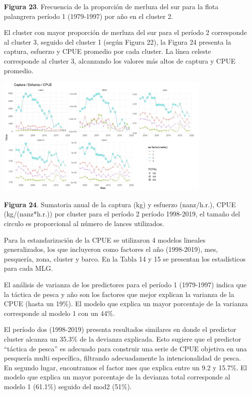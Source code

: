 \documentclass[
  spanish,
]{article}
\begin{document}
\small \textbf{Figura 23}. Frecuencia de la proporción de merluza del
sur para la flota palangrera período 1 (1979-1997) por año en el cluster
2. \vspace{0.5cm} \normalsize    

El cluster con mayor proporción de merluza del sur para el período 2
corresponde al cluster 3, seguido del cluster 1 (según Figura 22), la
Figura 24 presenta la captura, esfuerzo y CPUE promedio por cada
cluster. La línea celeste corresponde al cluster 3, alcanzando los
valores más altos de captura y CPUE promedio.

\begin{center}
\includegraphics[width=0.8\textwidth]{Figuras/Figura_24.png}
\end{center}

\small \textbf{Figura 24}. Sumatoria anual de la captura (kg) y esfuerzo
(nanz/h.r.), CPUE (kg/(nanz*h.r.)) por cluster para el período 2 período
1998-2019, el tamaño del circulo es proporcional al número de lances
utilizados. \vspace{0.5cm} \normalsize   

Para la estandarización de la CPUE se utilizaron 4 modelos lineales
generalizados, los que incluyeron como factores el año (1998-2019), mes,
pesquería, zona, cluster y barco. En la Tabla 14 y 15 se presentan los
estadísticos para cada MLG.

El análisis de varianza de los predictores para el período 1 (1979-1997)
indica que la táctica de pesca y año son los factores que mejor explican
la varianza de la CPUE (hasta un 19\%). El modelo que explica un mayor
porcentaje de la varianza corresponde al modelo 1 con un 44\%.

El período dos (1998-2019) presenta resultados similares en donde el
predictor cluster alcanza un 35.3\% de la devianza explicada. Esto
sugiere que el predictor ``táctica de pesca'' es adecuado para construir
una serie de CPUE objetiva en una pesquería multi específica, filtrando
adecuadamente la intencionalidad de pesca. En segundo lugar, encontramos
el factor mes que explica entre un 9.2 y 15.7\%. El modelo que explica
un mayor porcentaje de la devianza total corresponde al modelo 1
(61.1\%) seguido del mod2 (51\%).
\end{document}
